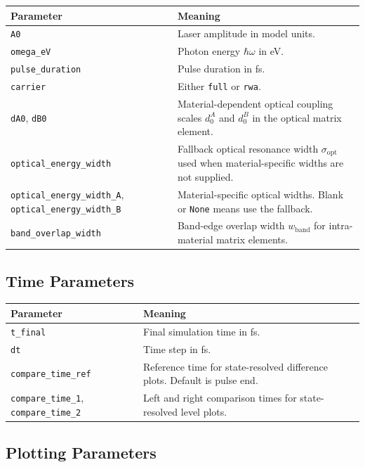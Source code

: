 \documentclass[11pt,a4paper]{article}
\begin{document}
\begin{longtable}{p{}p{}}
\toprule
Parameter & Meaning \\
\midrule
\texttt{A0} & Laser amplitude in model units. \\
\texttt{omega\_eV} & Photon energy $\hbar\omega$ in eV. \\
\texttt{pulse\_duration} & Pulse duration in fs. \\
\texttt{carrier} & Either \texttt{full} or \texttt{rwa}. \\
\texttt{dA0}, \texttt{dB0} & Material-dependent optical coupling scales $d^A_0$ and $d^B_0$ in the optical matrix element. \\
\texttt{optical\_energy\_width} & Fallback optical resonance width $\sigma_{\mathrm{opt}}$ used when material-specific widths are not supplied. \\
\texttt{optical\_energy\_width\_A}, \texttt{optical\_energy\_width\_B} & Material-specific optical widths. Blank or \texttt{None} means use the fallback. \\
\texttt{band\_overlap\_width} & Band-edge overlap width $w_{\mathrm{band}}$ for intra-material matrix elements. \\
\bottomrule
\end{longtable}

\subsection{Time Parameters}

\begin{longtable}{p{}p{}}
\toprule
Parameter & Meaning \\
\midrule
\texttt{t\_final} & Final simulation time in fs. \\
\texttt{dt} & Time step in fs. \\
\texttt{compare\_time\_ref} & Reference time for state-resolved difference plots.  Default is pulse end. \\
\texttt{compare\_time\_1}, \texttt{compare\_time\_2} & Left and right comparison times for state-resolved level plots. \\
\bottomrule
\end{longtable}

\subsection{Plotting Parameters}
\end{document}
